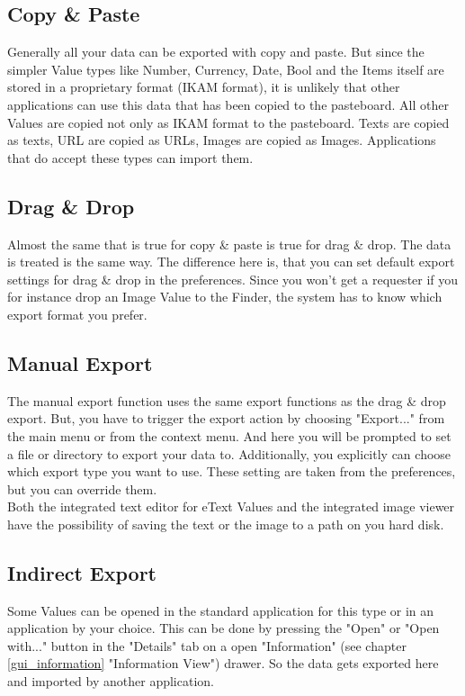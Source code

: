 \documentclass[12pt,a4]{article}
\begin{document}
\subsection{Copy \& Paste}
\label{cp_export}
\medskip
Generally all your data can be exported with copy and paste. But since the simpler Value types like Number, Currency, Date, Bool and the Items itself are stored in a proprietary format (IKAM format), it is unlikely that other applications can use this data that has been copied to the pasteboard. All other Values are copied not only as IKAM format to the pasteboard. Texts are copied as texts, URL are copied as URLs, Images are copied as Images. Applications that do accept these types can import them.
\subsection{Drag \& Drop}
\label{dd_export}
\medskip
Almost the same that is true for copy \& paste is true for drag \& drop. The data is treated is the same way. The difference here is, that you can set default export settings for drag \& drop in the preferences. Since you won't get a requester if you for instance drop an Image Value to the Finder, the system has to know which export format you prefer.
\subsection{Manual Export}
\label{manual_export}
\medskip
The manual export function uses the same export functions as the drag \& drop export. But, you have to trigger the export action by choosing "Export..." from the main menu or from the context menu. And here you will be prompted to set a file or directory to export your data to. Additionally, you explicitly can choose which export type you want to use. These setting are taken from the preferences, but you can override them. \\
Both the integrated text editor for eText Values and the integrated image viewer have the possibility of saving the text or the image to a path on you hard disk.
\subsection{Indirect Export}
\label{indirect_export}
\medskip
Some Values can be opened in the standard application for this type or in an application by your choice. This can be done by pressing the "Open" or "Open with..." button in the "Details" tab on a open "Information" (see chapter \ref{gui_information} "Information View") drawer. So the data gets exported here and imported by another application.
\end{document}
